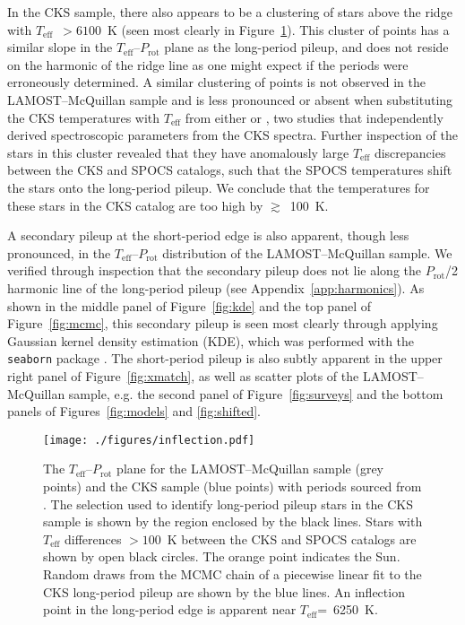 \documentclass[trackchanges,twocolumn]{aastex631}
\newcommand{\lamostmcq}{LAMOST--McQuillan\xspace}
\newcommand{\teff}{\ensuremath{T_{\mathrm{eff}}}\xspace}
\newcommand{\prot}{\ensuremath{P_\mathrm{rot}}\xspace}
\begin{document}
In the CKS sample, there also appears to be a clustering of stars above the ridge with \teff~$>6100$~K (seen most clearly in Figure~\ref{fig:inflection}). This cluster of points has a similar slope in the \teff--\prot plane as the long-period pileup, and does not reside on the harmonic of the ridge line as one might expect if the periods were erroneously determined. A similar clustering of points is not observed in the \lamostmcq sample and is less pronounced or absent when substituting the CKS temperatures with \teff from either \citet{Brewer2018} or \citet{Martinez2019}, two studies that independently derived spectroscopic parameters from the CKS spectra. Further inspection of the stars in this cluster revealed that they have anomalously large \teff discrepancies between the CKS and SPOCS catalogs, such that the SPOCS temperatures shift the stars onto the long-period pileup. We conclude that the temperatures for these stars in the CKS catalog are too high by $\gtrsim$~100~K.

A secondary pileup at the short-period edge is also apparent, though less pronounced, in the \teff--\prot distribution of the \lamostmcq sample. We verified through inspection that the secondary pileup does not lie along the \prot/2 harmonic line of the long-period pileup (see Appendix~\ref{app:harmonics}). As shown in the middle panel of Figure~\ref{fig:kde} and the top panel of Figure~\ref{fig:mcmc}, this secondary pileup is seen most clearly through applying Gaussian kernel density estimation (KDE), which was performed with the \texttt{seaborn} package \citep{seaborn}. The short-period pileup is also subtly apparent in the upper right panel of Figure~\ref{fig:xmatch}, as well as scatter plots of the \lamostmcq sample, e.g. the second panel of Figure~\ref{fig:surveys} and the bottom panels of Figures~\ref{fig:models} and \ref{fig:shifted}.


\begin{figure}
    \centering
    \texttt{[image: ./figures/inflection.pdf]}
    \caption{The \teff–\prot plane for the \lamostmcq sample (grey points) and the CKS sample (blue points) with periods sourced from \citet{David2021}. The selection used to identify long-period pileup stars in the CKS sample is shown by the region enclosed by the black lines. Stars with \teff differences $>100$~K between the CKS \citep{Fulton2018} and SPOCS \citep{Brewer2018} catalogs are shown by open black circles. The orange point indicates the Sun. Random draws from the MCMC chain of a piecewise linear fit to the CKS long-period pileup are shown by the blue lines. An inflection point in the long-period edge is apparent near \teff=~6250~K.}
    \label{fig:inflection}
\end{figure}
\end{document}

